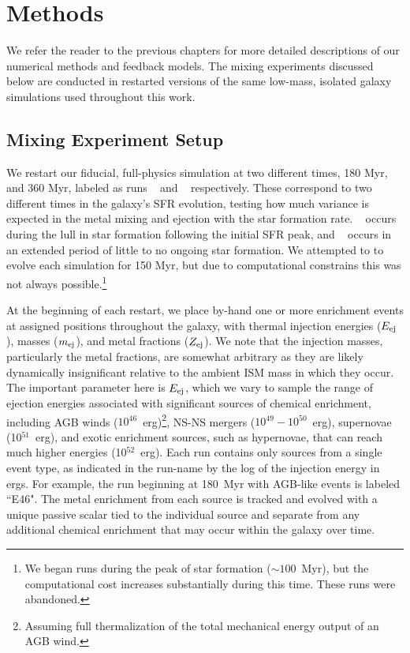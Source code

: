 \section{Methods}
\label{ch4:sec:methods}
We refer the reader to the previous chapters for more detailed descriptions of our numerical methods and feedback models. The mixing experiments discussed below are conducted in restarted versions of the same low-mass, isolated galaxy simulations used throughout this work.




\subsection{Mixing Experiment Setup}
\label{ch4:sec:experiment}
We restart our fiducial, full-physics simulation at two different times, 180 Myr, and 360 Myr, labeled as runs \runonenu~ and \runtwonu~ respectively. These correspond to two different times in the galaxy's SFR evolution, testing how much variance is expected in the metal mixing and ejection with the star formation rate. \runonenu~ occurs during the lull in star formation following the initial SFR peak, and \runtwonu~ occurs in an extended period of little to no ongoing star formation. We attempted to to evolve each simulation for 150 Myr, but due to computational constrains this was not always possible.\footnote{We began runs during the peak of star formation ($\sim 100$~Myr), but the computational cost increases substantially during this time. These runs were abandoned.}


At the beginning of each restart, we place by-hand one or more enrichment events at assigned positions throughout the galaxy, with thermal injection energies ($E_{\rm ej}$), masses ($m_{\rm ej}$), and metal fractions ($Z_{\rm ej}$). We note that the injection masses, particularly the metal fractions, are somewhat arbitrary as they are likely dynamically insignificant relative to the ambient ISM mass in which they occur. The important parameter here is $E_{\rm ej}$, which we vary to sample the range of ejection energies associated with significant sources of chemical enrichment, including AGB winds ($10^{46}$~erg)\footnote{Assuming full thermalization of the total mechanical energy output of an AGB wind.}, NS-NS mergers ($10^{49} - 10^{50}$~erg), supernovae (10$^{51}$~erg), and exotic enrichment sources, such as hypernovae, that can reach much higher energies (10$^{52}$~erg). Each run contains only sources from a single event type, as indicated in the run-name by the log of the injection energy in ergs. For example, the run beginning at 180~Myr with AGB-like events is labeled ``\runone E46". The metal enrichment from each source is tracked and evolved with a unique passive scalar tied to the individual source and separate from any additional chemical enrichment that may occur within the galaxy over time.

